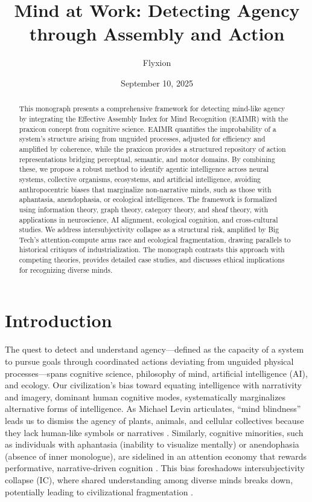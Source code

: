 \documentclass{article}
\title{Mind at Work: Detecting Agency through Assembly and Action}
\author{Flyxion}
\date{September 10, 2025}
\begin{document}
\maketitle

\begin{abstract}
This monograph presents a comprehensive framework for detecting mind-like agency by integrating the Effective Assembly Index for Mind Recognition (EAIMR) with the praxicon concept from cognitive science. EAIMR quantifies the improbability of a system’s structure arising from unguided processes, adjusted for efficiency and amplified by coherence, while the praxicon provides a structured repository of action representations bridging perceptual, semantic, and motor domains. By combining these, we propose a robust method to identify agentic intelligence across neural systems, collective organisms, ecosystems, and artificial intelligence, avoiding anthropocentric biases that marginalize non-narrative minds, such as those with aphantasia, anendophasia, or ecological intelligences. The framework is formalized using information theory, graph theory, category theory, and sheaf theory, with applications in neuroscience, AI alignment, ecological cognition, and cross-cultural studies. We address intersubjectivity collapse as a structural risk, amplified by Big Tech’s attention-compute arms race and ecological fragmentation, drawing parallels to historical critiques of industrialization. The monograph contrasts this approach with competing theories, provides detailed case studies, and discusses ethical implications for recognizing diverse minds.
\end{abstract}

\section{Introduction}
\label{sec:introduction}

The quest to detect and understand agency—defined as the capacity of a system to pursue goals through coordinated actions deviating from unguided physical processes—spans cognitive science, philosophy of mind, artificial intelligence (AI), and ecology. Our civilization’s bias toward equating intelligence with narrativity and imagery, dominant human cognitive modes, systematically marginalizes alternative forms of intelligence. As Michael Levin articulates, “mind blindness” leads us to dismiss the agency of plants, animals, and cellular collectives because they lack human-like symbols or narratives \citep{levin2022technological}. Similarly, cognitive minorities, such as individuals with aphantasia (inability to visualize mentally) or anendophasia (absence of inner monologue), are sidelined in an attention economy that rewards performative, narrative-driven cognition \citep{zeman2015, hurlburt2024}. This bias foreshadows intersubjectivity collapse (IC), where shared understanding among diverse minds breaks down, potentially leading to civilizational fragmentation \citep{pachniewski2023intersubjectivity}.
\end{document}
